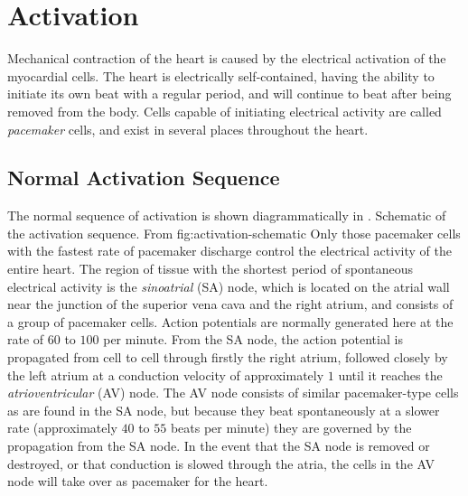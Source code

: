 \section{Activation}

Mechanical contraction of the heart is caused by the electrical activation of
the myocardial cells.  The heart is electrically self-contained, having the
ability to initiate its own beat with a regular period, and will continue to
beat after being removed from the body.  Cells capable of initiating
electrical activity are called \emph{pacemaker} cells, and exist in several
places throughout the heart.

\subsection{Normal Activation Sequence}

The normal sequence of activation is shown diagrammatically in
.
 {Schematic
  of the activation sequence.  From \protect\citet[Fig~27--23,
  p.~414]{zzz-berne:1988}}{fig:activation-schematic}{} Only those pacemaker
cells with the fastest rate of pacemaker discharge control the electrical
activity of the entire heart.  The region of tissue with the shortest period
of spontaneous electrical activity is the \emph{sinoatrial} (SA) node, which
is located on the atrial wall near the junction of the superior vena cava and
the right atrium, and consists of a group of pacemaker cells.  Action
potentials are normally generated here at the rate of $60$ to $100$ per
minute.  From the SA node, the action potential is propagated from cell to
cell through firstly the right atrium, followed closely by the left atrium at
a conduction velocity of approximately $1$ \mps until it reaches the
\emph{atrioventricular} (AV) node.  The AV node consists of similar
pacemaker-type cells as are found in the SA node, but because they beat
spontaneously at a slower rate (approximately $40$ to $55$ beats per minute)
they are governed by the propagation from the SA node.  In the event that the
SA node is removed or destroyed, or that conduction is slowed through the
atria, the cells in the AV node will take over as pacemaker for the heart.

